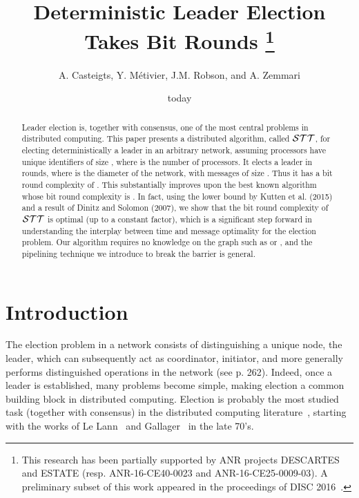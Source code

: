 \documentclass[11pt,envcountsame,letterpaper]{llncs}
\title{\large Deterministic Leader Election Takes  Bit Rounds
\thanks{This research has been partially supported by ANR projects DESCARTES and ESTATE (resp. ANR-16-CE40-0023 and ANR-16-CE25-0009-03). A preliminary subset of this work 
appeared in the proceedings of DISC 2016~\cite{CMRZ16a}.
}
}
\author{A. Casteigts, Y. M\'etivier, J.M. Robson, and A. Zemmari}
\institute{Universit\'e de Bordeaux - Bordeaux INP
 LaBRI, UMR CNRS 5800\\ 351 cours de la
  Lib\'eration, 33405 Talence, France\\ 
\{acasteig, metivier, robson, zemmari\}@labri.fr }
\begin{document}
\newcommand{\STT}{\ensuremath{{\cal STT}}\xspace}

\maketitle 
\date{today}
\begin{abstract}
  Leader election is, together with consensus, one of the most central
  problems in distributed computing. This paper presents a distributed
  algorithm, called \STT, for electing deterministically a leader in
  an arbitrary network, assuming processors have unique identifiers of
  size , where  is the number of processors. It elects a
  leader in  rounds, where  is the diameter of the
  network, with messages of size . Thus it has a bit round
  complexity of . This substantially improves upon the
  best known algorithm whose bit round complexity is . In
  fact, using the lower bound by Kutten et al. (2015) and a
  result of Dinitz and Solomon (2007), we show that the bit round
  complexity of \STT is optimal (up to a constant factor), which is a
  significant step forward in understanding the interplay between time
  and message optimality for the election problem. Our algorithm
  requires no knowledge on the graph such as  or , and the
  pipelining technique we introduce to break the  barrier
  is general.
\end{abstract}
\section{Introduction}
\label{sec:introduction}
The election problem in a network consists of distinguishing a unique node, the leader, which
 can subsequently act as coordinator, initiator, 
and more generally performs distinguished operations in the network
 (see \cite{Tanenbaum} p. 262). 
Indeed, once a leader is established, many problems become simple, making election a common building
block
in distributed computing. Election is probably the most studied task (together with consensus) in the distributed computing literature~\cite{DMR08},
starting with the works of Le Lann~\cite{LeLann} and Gallager~\cite{Gallager} in the late 70's. 
\end{document}
